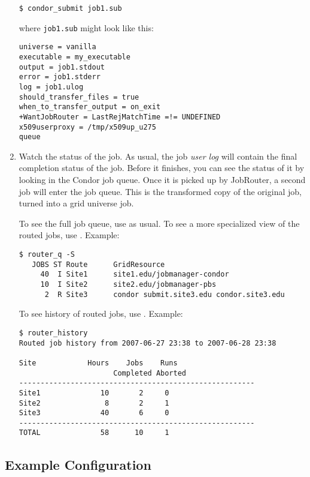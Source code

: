 \begin{enumerate}
\begin{verbatim}
$ condor_submit job1.sub
\end{verbatim}

where \verb|job1.sub| might look like this:

\begin{verbatim}
universe = vanilla
executable = my_executable
output = job1.stdout
error = job1.stderr
log = job1.ulog
should_transfer_files = true
when_to_transfer_output = on_exit
+WantJobRouter = LastRejMatchTime =!= UNDEFINED
x509userproxy = /tmp/x509up_u275
queue
\end{verbatim}

\item Watch the status of the job.  As usual, the job \textit{user log} will
contain the final completion status of the job.  Before it finishes,
you can see the status of it by looking in the Condor job queue.  Once
it is picked up by JobRouter, a second job will enter the job queue.
This is the transformed copy of the original job, turned into a grid
universe job.

To see the full job queue, use  as usual.  To
see a more specialized view of the routed jobs, use
.  Example:

\begin{verbatim}
$ router_q -S
   JOBS ST Route      GridResource
     40  I Site1      site1.edu/jobmanager-condor
     10  I Site2      site2.edu/jobmanager-pbs
      2  R Site3      condor submit.site3.edu condor.site3.edu
\end{verbatim}

To see history of routed jobs, use .  Example:

\begin{verbatim}
$ router_history
Routed job history from 2007-06-27 23:38 to 2007-06-28 23:38

Site            Hours    Jobs    Runs
                      Completed Aborted
-------------------------------------------------------
Site1              10       2     0
Site2               8       2     1
Site3              40       6     0
-------------------------------------------------------
TOTAL              58      10     1
\end{verbatim}

\end{enumerate}


\subsection{Example Configuration}\label{ExampleJobRouterConfiguration}

